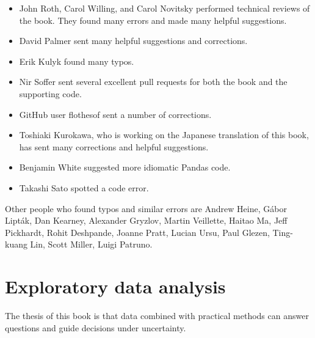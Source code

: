 \documentclass[12pt]{book}
\begin{document}
\begin{itemize}
\item John Roth, Carol Willing, and Carol Novitsky performed technical
reviews of the book.  They found many errors and made many
helpful suggestions.

\item David Palmer sent many helpful suggestions and corrections.

\item Erik Kulyk found many typos.

\item Nir Soffer sent several excellent pull requests for both the
  book and the supporting code.

\item GitHub user flothesof sent a number of corrections.

\item Toshiaki Kurokawa, who is working on the Japanese translation of
this book, has sent many corrections and helpful suggestions.

\item Benjamin White suggested more idiomatic Pandas code.

\item Takashi Sato spotted a code error.


\end{itemize}

Other people who found typos and similar errors are Andrew Heine,
G\'{a}bor Lipt\'{a}k,
Dan Kearney,
Alexander Gryzlov, 
Martin Veillette, 
Haitao Ma, 
Jeff Pickhardt,
Rohit Deshpande,
Joanne Pratt,
Lucian Ursu,
Paul Glezen,
Ting-kuang Lin,
Scott Miller,
Luigi Patruno.



\normalsize

\clearemptydoublepage

\begin{latexonly}

\tableofcontents

\clearemptydoublepage

\end{latexonly}

\mainmatter


\chapter{Exploratory data analysis}
\label{intro}

The thesis of this book is that data combined with practical
methods can answer questions and guide decisions under uncertainty.
\end{document}
